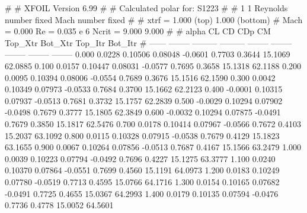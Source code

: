 #  
#       XFOIL         Version 6.99
#  
# Calculated polar for: S1223                                           
#  
# 1 1 Reynolds number fixed          Mach number fixed         
#  
# xtrf =   1.000 (top)        1.000 (bottom)  
# Mach =   0.000     Re =     0.035 e 6     Ncrit =   9.000  9.000
#  
#   alpha    CL        CD       CDp       CM     Top_Xtr  Bot_Xtr  Top_Itr  Bot_Itr
#  ------ -------- --------- --------- -------- -------- -------- -------- --------
   0.000   0.0228   0.10506   0.08048  -0.0601   0.7703   0.3644  15.1069  62.0885
   0.100   0.0157   0.10447   0.08031  -0.0577   0.7695   0.3658  15.1318  62.1188
   0.200   0.0095   0.10394   0.08006  -0.0554   0.7689   0.3676  15.1516  62.1590
   0.300   0.0042   0.10349   0.07973  -0.0533   0.7684   0.3700  15.1662  62.2123
   0.400  -0.0001   0.10315   0.07937  -0.0513   0.7681   0.3732  15.1757  62.2839
   0.500  -0.0029   0.10294   0.07902  -0.0498   0.7679   0.3777  15.1805  62.3849
   0.600  -0.0032   0.10294   0.07875  -0.0491   0.7679   0.3850  15.1817  62.5476
   0.700   0.0178   0.10414   0.07967  -0.0566   0.7672   0.4103  15.2037  63.1092
   0.800   0.0115   0.10328   0.07915  -0.0538   0.7679   0.4129  15.1823  63.1655
   0.900   0.0067   0.10264   0.07856  -0.0513   0.7687   0.4167  15.1566  63.2479
   1.000   0.0039   0.10223   0.07794  -0.0492   0.7696   0.4227  15.1275  63.3777
   1.100   0.0240   0.10370   0.07864  -0.0551   0.7699   0.4560  15.1191  64.0973
   1.200   0.0183   0.10249   0.07780  -0.0519   0.7713   0.4595  15.0766  64.1716
   1.300   0.0154   0.10165   0.07682  -0.0491   0.7725   0.4655  15.0367  64.2993
   1.400   0.0179   0.10135   0.07594  -0.0476   0.7736   0.4778  15.0052  64.5601

